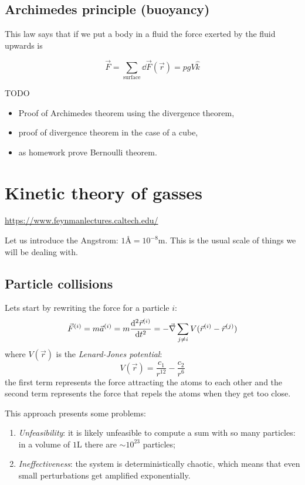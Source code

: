 \documentclass[14pt]{extarticle}
\begin{document}
\subsection{Archimedes principle (buoyancy)}

This law says that if we put a body in a fluid the force exerted by the fluid upwards is

\begin{equation}
    \vec F = \sum_{\text{surface}} \dd{\vec F}(\vec r) = pgV \hat k
\end{equation}

TODO
\begin{itemize}
    \item
          Proof of Archimedes theorem using the divergence theorem,
    \item
          proof of divergence theorem in the case of a cube,
    \item
          as homework prove Bernoulli theorem.
\end{itemize}

\section{Kinetic theory of gasses}

\url{https://www.feynmanlectures.caltech.edu/}

Let us introduce the Angstrom: $1 \si{\angstrom} = 10^{-8} \si{\meter}$. This is the usual scale of things we will be dealing with.

\subsection{Particle collisions}

Lets start by rewriting the force for a particle $i$:
\begin{equation}
    \vec F^{(i)} = m \vec a^{(i)} = m \dv[2]{\vec r^{(i)}}{t} = - \vec \nabla \sum_{j \ne i} V(\vec r^{(i)} - \vec r^{(j)})
\end{equation}
where $V(\vec r)$ is the \emph{Lenard-Jones potential}:
\begin{equation}
    V(\vec r) = \frac{c_1}{r^{12}} - \frac{c_2}{r^6}
\end{equation}
the first term represents the force attracting the atoms to each other and the second term represents the force that repels the atoms when they get too close.

This approach presents some problems:
\begin{enumerate}
    \item \emph{Unfeasibility}: it is likely unfeasible to compute a sum with so many particles: in a volume of $1 \si{\liter}$ there are $\sim 10^{23}$ particles;
    \item \emph{Ineffectiveness}: the system is deterministically chaotic, which means that even small perturbations get amplified exponentially.
\end{enumerate}
\end{document}
